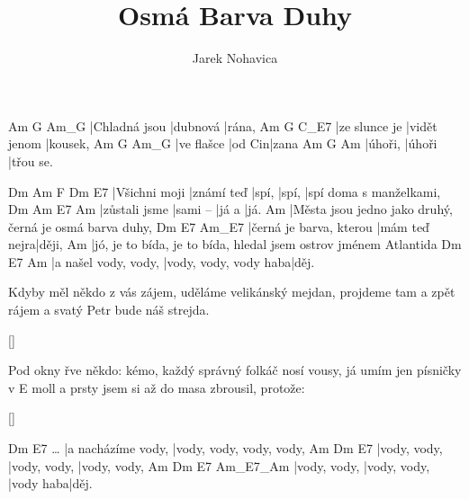\documentclass{song}
\author{Jarek Nohavica}
\title{Osmá Barva Duhy}
\begin{document}
\strophe
Am            G        Am_G
|Chladná jsou |dubnová |rána,
Am            G            C_E7
|ze slunce je |vidět jenom |kousek,
Am         G      Am_G
|ve flašce |od Cin|zana
Am      G      Am
|úhoři, |úhoři |třou se.
\endstrophe

Dm            Am         F     Dm    E7
|Všichni moji |známí teď |spí, |spí, |spí doma s manželkami,
Dm            Am       E7    Am
|zůstali jsme |sami -- |já a |já.
Am
|Města jsou jedno jako druhý, černá je osmá barva duhy,
Dm                      E7            Am_E7
|černá je barva, kterou |mám teď nejra|ději,
Am
|jó, je to bída, je to bída, hledal jsem ostrov jménem Atlantida
Dm                   E7                    Am
|a našel vody, vody, |vody, vody, vody haba|děj.
\endstrophe

\strophe*
Kdyby měl někdo z vás zájem,
uděláme velikánský mejdan,
projdeme tam a zpět rájem
a svatý Petr bude náš strejda.
\endstrophe

\ref{}

\strophe*
Pod okny řve někdo: kémo,
každý správný folkáč nosí vousy,
já umím jen písničky v E moll
a prsty jsem si až do masa zbrousil, protože:
\endstrophe

\ref{}

\strophe
         Dm                 E7
\ldots{} |a nacházíme vody, |vody, vody, vody, vody,
Am           Dm           E7
|vody, vody, |vody, vody, |vody, vody,
Am           Dm           E7        Am_E7_Am
|vody, vody, |vody, vody, |vody haba|děj.
\endstrophe
\end{document}
